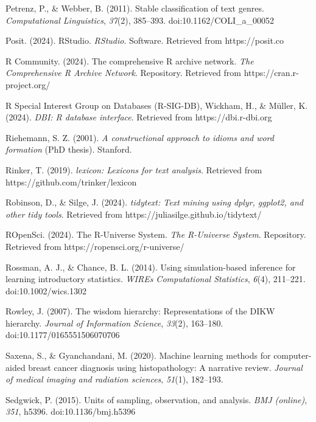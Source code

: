 \documentclass[
  letterpaper,
  krantz1]{latex/krantz-mod}
\newlength{\cslhangindent}
\newenvironment{CSLReferences}[2] %
 {\begin{list}{}{%
  \setlength{\itemindent}{0pt}
  \setlength{\leftmargin}{0pt}
  \setlength{\parsep}{0pt}
  \ifodd #1
   \setlength{\leftmargin}{\cslhangindent}
   \setlength{\itemindent}{-1\cslhangindent}
  \fi
  \setlength{\itemsep}{#2\baselineskip}}}
 {\end{list}}
\theoremstyle{definition}
\theoremstyle{definition}
\theoremstyle{remark}
\begin{document}
\begin{CSLReferences}{1}{0}
Petrenz, P., \& Webber, B. (2011). Stable classification of text genres.
\emph{Computational Linguistics}, \emph{37}(2), 385--393.
doi:10.1162/COLI\_a\_00052

Posit. (2024). {RStudio}. \emph{RStudio}. Software. Retrieved from
https://posit.co

R Community. (2024). The comprehensive {R} archive network. \emph{The
Comprehensive R Archive Network}. Repository. Retrieved from
https://cran.r-project.org/

R Special Interest Group on Databases (R-SIG-DB), Wickham, H., \&
Müller, K. (2024). \emph{{DBI}: R database interface}. Retrieved from
https://dbi.r-dbi.org

Riehemann, S. Z. (2001). \emph{A constructional approach to idioms and
word formation} (PhD thesis). Stanford.

Rinker, T. (2019). \emph{{lexicon}: Lexicons for text analysis}.
Retrieved from https://github.com/trinker/lexicon

Robinson, D., \& Silge, J. (2024). \emph{{tidytext}: Text mining using
dplyr, ggplot2, and other tidy tools}. Retrieved from
https://juliasilge.github.io/tidytext/

ROpenSci. (2024). The {R-Universe System}. \emph{The R-Universe System}.
Repository. Retrieved from https://ropensci.org/r-universe/

Rossman, A. J., \& Chance, B. L. (2014). Using simulation-based
inference for learning introductory statistics. \emph{WIREs
Computational Statistics}, \emph{6}(4), 211--221. doi:10.1002/wics.1302

Rowley, J. (2007). The wisdom hierarchy: {Representations} of the {DIKW}
hierarchy. \emph{Journal of Information Science}, \emph{33}(2),
163--180. doi:10.1177/0165551506070706

Saxena, S., \& Gyanchandani, M. (2020). Machine learning methods for
computer-aided breast cancer diagnosis using histopathology: A narrative
review. \emph{Journal of medical imaging and radiation sciences},
\emph{51}(1), 182--193.

Sedgwick, P. (2015). Units of sampling, observation, and analysis.
\emph{BMJ (online)}, \emph{351}, h5396. doi:10.1136/bmj.h5396


\end{CSLReferences}
\end{document}
